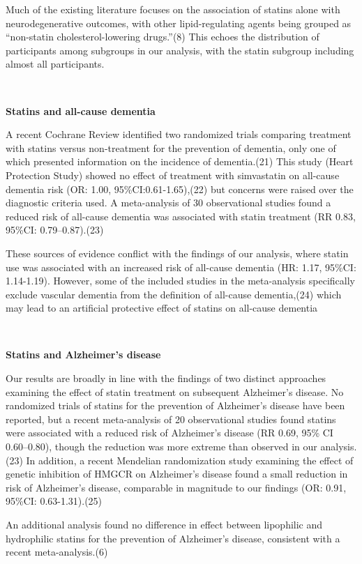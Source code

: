 \documentclass[
]{article}
\begin{document}
Much of the existing literature focuses on the association of statins alone with neurodegenerative outcomes, with other lipid-regulating agents being grouped as ``non-statin cholesterol-lowering drugs.''(8) This echoes the distribution of participants among subgroups in our analysis, with the statin subgroup including almost all participants.

~

\textbf{Statins and all-cause dementia}

A recent Cochrane Review identified two randomized trials comparing treatment with statins versus non-treatment for the prevention of dementia, only one of which presented information on the incidence of dementia.(21) This study (Heart Protection Study) showed no effect of treatment with simvastatin on all-cause dementia risk (OR: 1.00, 95\%CI:0.61-1.65),(22) but concerns were raised over the diagnostic criteria used. A meta-analysis of 30 observational studies found a reduced risk of all-cause dementia was associated with statin treatment (RR 0.83, 95\%CI: 0.79--0.87).(23)

These sources of evidence conflict with the findings of our analysis, where statin use was associated with an increased risk of all-cause dementia (HR: 1.17, 95\%CI: 1.14-1.19). However, some of the included studies in the meta-analysis specifically exclude vascular dementia from the definition of all-cause dementia,(24) which may lead to an artificial protective effect of statins on all-cause dementia

~

\textbf{Statins and Alzheimer's disease}

Our results are broadly in line with the findings of two distinct approaches examining the effect of statin treatment on subsequent Alzheimer's disease. No randomized trials of statins for the prevention of Alzheimer's disease have been reported, but a recent meta-analysis of 20 observational studies found statins were associated with a reduced risk of Alzheimer's disease (RR 0.69, 95\% CI 0.60--0.80), though the reduction was more extreme than observed in our analysis.(23) In addition, a recent Mendelian randomization study examining the effect of genetic inhibition of HMGCR on Alzheimer's disease found a small reduction in risk of Alzheimer's disease, comparable in magnitude to our findings (OR: 0.91, 95\%CI: 0.63-1.31).(25)

An additional analysis found no difference in effect between lipophilic and hydrophilic statins for the prevention of Alzheimer's disease, consistent with a recent meta-analysis.(6)
\end{document}
